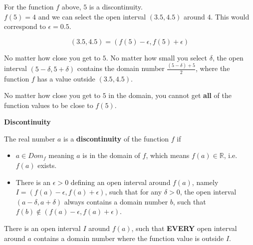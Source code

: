 \documentclass{ximera}
\begin{document}
\begin{observation}

For the function $f$ above, $5$ is a discontinuity. \\


$f(5) = 4$ and we can select the open interval $(3.5, 4.5)$ around $4$.   This would correspond to $\epsilon = 0.5$.

\[   (3.5, 4.5) = (f(5) - \epsilon, f(5) + \epsilon)    \]


No matter how close you get to $5$.  No matter how small you select $\delta$, the open interval $(5 - \delta, 5 + \delta)$ contains the domain number $\frac{(5 - \delta) + 5}{2}$, where the function $f$ has a value outside $(3.5, 4.5)$.


No matter how close you get to $5$ in the domain, you cannot get \textbf{\textcolor{blue!55!black}{all}} of the function values to be close to $f(5)$.

\end{observation}



















\begin{definition} \textbf{\textcolor{green!50!black}{Discontinuity}}

The real number $a$ is a \textbf{discontinuity} of the function $f$ if

\begin{itemize}
\item $a \in Dom_f$ meaning $a$ is in the domain of $f$, which means $f(a) \in \mathbb{R}$, i.e. $f(a)$ exists.
\item There is an $\epsilon > 0$ defining an open interval around $f(a)$, namely $I = (f(a) - \epsilon, f(a) + \epsilon)$, such that for any $\delta > 0$, the open interval $(a - \delta, a + \delta)$ always contains a domain number $b$, such that $f(b) \not\in(f(a)-\epsilon, f(a)+\epsilon)$.
\end{itemize}

There is an open interval $I$ around $f(a)$, such that \textbf{\textcolor{purple!85!blue}{EVERY}} open interval around $a$ contains a domain number where the function value is outside $I$.

\end{definition}
\end{document}
